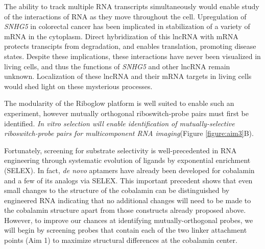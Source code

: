 The ability to track multiple RNA transcripts simultaneously would enable study of the interactions of RNA as they move throughout the cell. Upregulation of \textit{SNHG5} in colorectal cancer has been implicated in stabilization of a variety of mRNA in the cytoplasm\cite{DamasSNHG5promotescolorectal2016}. Direct hybridization of this lncRNA with mRNA protects transcipts from degradation, and enables translation, promoting disease states. Despite these implications, these interactions have never been visualized in living cells, and thus the functions of \textit{SNHG5} and other lncRNA remain unknown. Localization of these lncRNA and their mRNA targets in living cells would shed light on these mysterious processes.

The modularity of the Riboglow platform is well suited to enable such an experiment, however mutually orthogonal riboswitch-probe pairs must first be identified. \textit{In vitro selection will enable identification of mutually-selective riboswitch-probe pairs for multicomponent RNA imaging}(Figure \ref{figure:aim3}B).

Fortunately, screening for substrate selectivity is well-precedented in RNA engineering through systematic evolution of ligands by exponential enrichment (SELEX)\cite{MairalAptamersmoleculartools2008,ChoApplicationsAptamersSensors2009}.
In fact, \textit{de novo} aptamers have already been developed for cobalamin and a few of its analogs via SELEX\cite{LorschvitroselectionRNA1994}. This important precedent shows that even small changes to the structure of the cobalamin can be distinguished by engineered RNA indicating that no additional changes will need to be made to the cobalamin structure apart from those constructs already proposed above. However, to improve our chances at identifying mutually-orthogonal probes, we will begin by screening probes that contain each of the two linker attachment points (Aim 1) to maximize structural differences at the cobalamin center.

